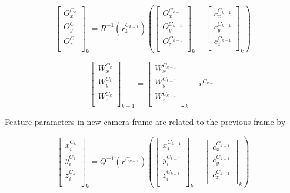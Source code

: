 \begin{equation}
\begin{bmatrix}
O_{x}^{C_{k}} \\
O_{y}^{C} \\
O_{z}^{C} \\
\end{bmatrix}_{k}=R^{-1}(r_{k}^{C_{k-1}})\left(
\begin{bmatrix}
O_{x}^{C_{k-1}} \\
O_{y}^{C_{k-1}} \\
O_{z}^{C_{k-1}} \\
\end{bmatrix}_{k}- \begin{bmatrix}
c_{x}^{C_{k-1}} \\
c_{y}^{C_{k-1}} \\
c_{z}^{C_{k-1}} \\
\end{bmatrix}_{k}\right)
\end{equation}

\begin{equation}
\begin{bmatrix}
W_{x}^{C_{k}} \\
W_{y}^{C_{k}} \\
W_{z}^{C_{k}} \\
\end{bmatrix}_{k-1}= \begin{bmatrix}
W_{x}^{C_{k-1}} \\
W_{y}^{C_{k-1}} \\
W_{z}^{C_{k-1}} \\
\end{bmatrix}_{k}-r^{C_{k-1}}
\end{equation}

Feature parameters in new camera frame are related to the previous frame 
by

\begin{equation}
\begin{bmatrix}
x_{i}^{C_{k}} \\
y_{i}^{C_{k}} \\
z_{i}^{C_{k}} \\
\end{bmatrix}_{k}=Q^{-1}(r^{C_{k-1}})\left(
\begin{bmatrix}
x_{i}^{C_{k-1}} \\
y_{i}^{C_{k-1}} \\
z_{i}^{C_{k-1}} \\
\end{bmatrix}_{k}- \begin{bmatrix}
c_{x}^{C_{k-1}} \\
c_{y}^{C_{k-1}} \\
c_{z}^{C_{k-1}} \\
\end{bmatrix}_{k}\right)
\end{equation}


